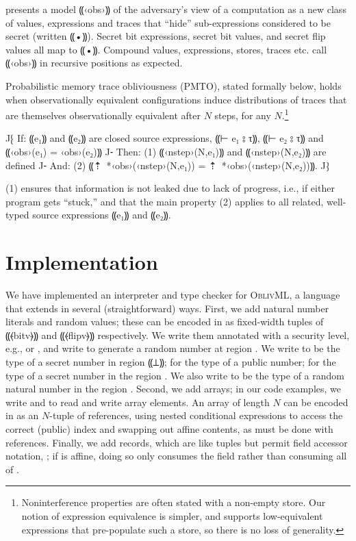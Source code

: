  presents a model ⸨‹obs›⸩ of the adversary's view of
a computation as a new class of values,
expressions and traces that ``hide'' sub-expressions
considered to be secret (written ⸨•⸩).  Secret bit expressions, secret bit values, and secret flip
values all map to ⸨•⸩. Compound values, expressions, stores, traces etc. call ⸨‹obs›⸩ in recursive
positions as expected.

Probabilistic memory trace obliviousness (PMTO), stated formally
below, holds when observationally equivalent configurations induce
distributions of traces that are themselves observationally equivalent
after $N$ steps, for any $N$.\footnote{Noninterference
  properties are often stated with a non-empty store.
  Our notion of expression equivalence is simpler, and supports
  low-equivalent expressions that pre-populate such a
  store, so there is no loss of generality.}
\begin{proposition}[PMTO]\label{thm:obliv-pmto}
  J⁅ If: ⸨e₁⸩ and ⸨e₂⸩ are closed source expressions, ⸨⊢ e₁ ⦂ τ⸩, ⸨⊢ e₂ ⦂ τ⸩ and ⸨‹obs›(e₁) = ‹obs›(e₂)⸩
  J⁃ Then: (1) ⸨‹nstep›(N,e₁)⸩ and ⸨‹nstep›(N,e₂)⸩ are defined
  J⁃ And: (2) ⸨⇡~*{‹obs›}(‹nstep›(N,e₁)) = ⇡~*{‹obs›}(‹nstep›(N,e₂))⸩.
  J⁆
\end{proposition}
\noindent
(1) ensures that information is not leaked due to lack of progress, {i.e.}, if
either program gets “stuck,” and that the main property (2) applies to all
related, well-typed source expressions ⸨e₁⸩ and ⸨e₂⸩.

\section{Implementation}
\label{sec:obliv-impl}

We have implemented an interpreter and type checker for \textsc{OblivML},  a language that extends \obliv in
several (straightforward) ways.
%
First, we add natural number literals and random values; these can be
  encoded in \obliv as fixed-width tuples of ⸨⦑bitv⦒⸩ and ⸨⦑flipv⦒⸩
  respectively. We write them annotated with a security level, e.g.,
   or , and write  to generate a
  random number at region . We write  to be the
  type of a secret number in region ⸨⊥⸩;  for the type of a
  public number;  for the type of a secret number in the
  region .  We also write  to be the
  type of a random natural number in the region .
Second, we add arrays; in our code examples, we write
   and  to read and write array
  elements. An array of length $N$ can be encoded in \lang as
  an $N$-tuple of references, using nested conditional expressions to
  access the correct (public) index and swapping out affine
  contents, as must be done with references.
Finally, we add records, which are like tuples but permit field accessor
  notation, ; if  is affine, doing so only consumes the field 
rather than consuming all of .

